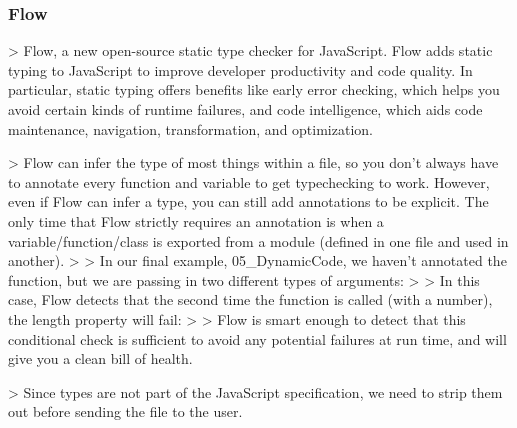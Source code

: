 
\subsubsection{Flow}
> Flow, a new open-source static type checker for JavaScript. Flow adds static typing to JavaScript to improve developer productivity and code quality. In particular, static typing offers benefits like early error checking, which helps you avoid certain kinds of runtime failures, and code intelligence, which aids code maintenance, navigation, transformation, and optimization.


> Flow can infer the type of most things within a file, so you don't always have to annotate every function and variable to get typechecking to work. However, even if Flow can infer a type, you can still add annotations to be explicit. The only time that Flow strictly requires an annotation is when a variable/function/class is exported from a module (defined in one file and used in another).
>
> In our final example, 05\_DynamicCode, we haven't annotated the function, but we are passing in two different types of arguments:
>
> In this case, Flow detects that the second time the function is called (with a number), the length property will fail:
>
> Flow is smart enough to detect that this conditional check is sufficient to avoid any potential failures at run time, and will give you a clean bill of health.


> Since types are not part of the JavaScript specification, we need to strip them out before sending the file to the user.


